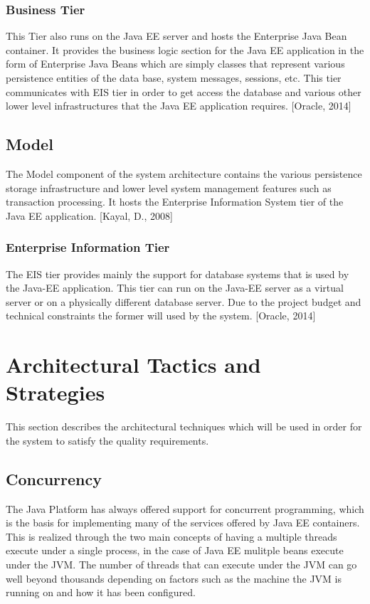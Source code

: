 \documentclass[12pt]{article}
\begin{document}
\subsubsection{Business Tier}
This Tier also runs on the Java EE server and hosts the Enterprise Java Bean container. It provides the business logic section for the Java EE application in the form of Enterprise Java Beans which are simply classes that represent various persistence entities of the data base, system messages, sessions, etc. This tier communicates with EIS tier in order to get access the database and various other lower level infrastructures that the Java EE application requires. [Oracle, 2014]
\subsection{Model}
The Model component of the system architecture contains the various persistence storage infrastructure and lower level system management features such as transaction processing. It hosts the Enterprise Information System tier of the Java EE application. [Kayal, D., 2008]
\subsubsection{Enterprise Information Tier} 
The EIS tier provides mainly the support for database systems that is used by the Java-EE application. This tier can run on the Java-EE server as a virtual server or on a physically different database server. Due to the project budget and technical constraints the former will used by the system. [Oracle, 2014] 
 
\section{Architectural Tactics and Strategies} %
This section describes the architectural techniques which will be used in order for the system to satisfy the quality requirements. 

\subsection{Concurrency}
The Java Platform has always offered support for concurrent programming, which is the basis for implementing many of the services offered by Java EE containers. This is realized through the two main concepts of having a multiple threads execute under a single process, in the case of Java EE mulitple beans execute under the JVM. The number of threads that can execute under the JVM can go well beyond thousands depending on factors such as the machine the JVM is running on and how it has been configured.\\
\end{document}
